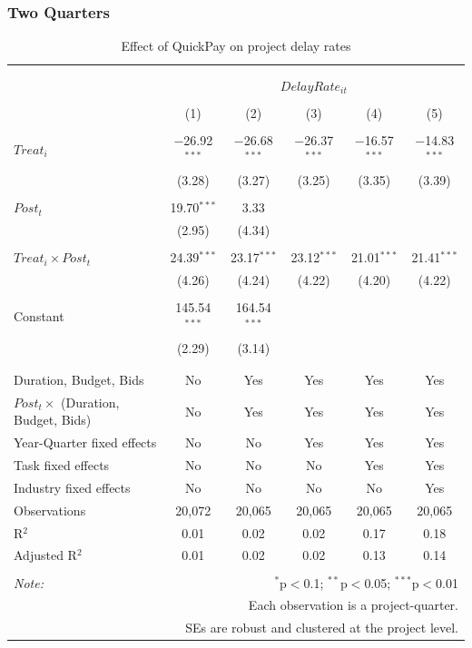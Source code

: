 \documentclass[
]{article}
\begin{document}
\hypertarget{two-quarters-4}{%
\subsubsection{Two Quarters}\label{two-quarters-4}}

\begin{table}[H] \centering 
  \caption{Effect of QuickPay on project delay rates} 
  \label{} 
\small 
\begin{tabular}{@{\extracolsep{-2pt}}lccccc} 
\\[-1.8ex]\hline 
\hline \\[-1.8ex] 
\\[-1.8ex] & \multicolumn{5}{c}{$DelayRate_{it}$} \\ 
\\[-1.8ex] & (1) & (2) & (3) & (4) & (5)\\ 
\hline \\[-1.8ex] 
 $Treat_i$ & $-$26.92$^{***}$ & $-$26.68$^{***}$ & $-$26.37$^{***}$ & $-$16.57$^{***}$ & $-$14.83$^{***}$ \\ 
  & (3.28) & (3.27) & (3.25) & (3.35) & (3.39) \\ 
  & & & & & \\ 
 $Post_t$ & 19.70$^{***}$ & 3.33 &  &  &  \\ 
  & (2.95) & (4.34) &  &  &  \\ 
  & & & & & \\ 
 $Treat_i \times Post_t$ & 24.39$^{***}$ & 23.17$^{***}$ & 23.12$^{***}$ & 21.01$^{***}$ & 21.41$^{***}$ \\ 
  & (4.26) & (4.24) & (4.22) & (4.20) & (4.22) \\ 
  & & & & & \\ 
 Constant & 145.54$^{***}$ & 164.54$^{***}$ &  &  &  \\ 
  & (2.29) & (3.14) &  &  &  \\ 
  & & & & & \\ 
\hline \\[-1.8ex] 
Duration, Budget, Bids & No & Yes & Yes & Yes & Yes \\ 
$Post_t \times$  (Duration, Budget, Bids) & No & Yes & Yes & Yes & Yes \\ 
Year-Quarter fixed effects & No & No & Yes & Yes & Yes \\ 
Task fixed effects & No & No & No & Yes & Yes \\ 
Industry fixed effects & No & No & No & No & Yes \\ 
Observations & 20,072 & 20,065 & 20,065 & 20,065 & 20,065 \\ 
R$^{2}$ & 0.01 & 0.02 & 0.02 & 0.17 & 0.18 \\ 
Adjusted R$^{2}$ & 0.01 & 0.02 & 0.02 & 0.13 & 0.14 \\ 
\hline 
\hline \\[-1.8ex] 
\textit{Note:}  & \multicolumn{5}{r}{$^{*}$p$<$0.1; $^{**}$p$<$0.05; $^{***}$p$<$0.01} \\ 
 & \multicolumn{5}{r}{Each observation is a project-quarter.} \\ 
 & \multicolumn{5}{r}{SEs are robust and clustered at the project level.} \\ 
\end{tabular} 
\end{table}
\end{document}

